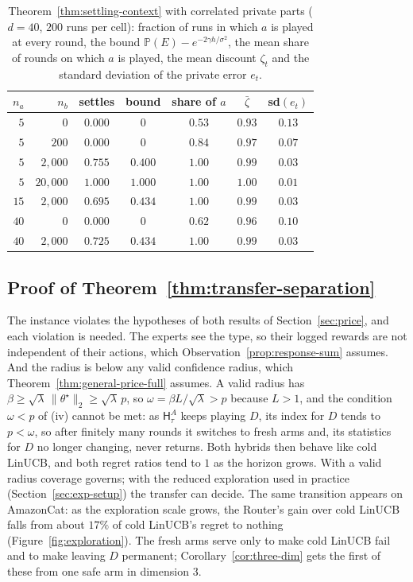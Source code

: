 \documentclass[anon]{alt2027} %
\newcommand{\Prb}{\mathbb{P}}
\newcommand{\Hyb}{\mathsf{H}}
\begin{document}
\begin{table}[!htb]
\centering
\caption{Theorem~\ref{thm:settling-context} with correlated private parts
($d=40$, $200$ runs per cell): fraction of runs in which $a$ is played at
every round, the bound $\Prb(E)-e^{-2\gamma h/\sigma^2}$, the mean share of
rounds on which $a$ is played, the mean discount $\zeta_t$ and the standard
deviation of the private error $e_t$.}
\label{tab:context-corr}
\small
\begin{tabular}{@{}rrccccc@{}}
\toprule
$n_a$ & $n_b$ & settles & bound & share of $a$ & $\bar\zeta$ & sd$(e_t)$\\
\midrule
$5$ & $0$ & $0.000$ & $0$ & $0.53$ & $0.93$ & $0.13$\\
$5$ & $200$ & $0.000$ & $0$ & $0.84$ & $0.97$ & $0.07$\\
$5$ & $2{,}000$ & $0.755$ & $0.400$ & $1.00$ & $0.99$ & $0.03$\\
$5$ & $20{,}000$ & $1.000$ & $1.000$ & $1.00$ & $1.00$ & $0.01$\\
$15$ & $2{,}000$ & $0.695$ & $0.434$ & $1.00$ & $0.99$ & $0.03$\\
$40$ & $0$ & $0.000$ & $0$ & $0.62$ & $0.96$ & $0.10$\\
$40$ & $2{,}000$ & $0.725$ & $0.434$ & $1.00$ & $0.99$ & $0.03$\\
\bottomrule
\end{tabular}
\end{table}

\subsection{Proof of Theorem~\ref{thm:transfer-separation}}
\label{app:proof-sep-only}

\begin{remark}
\label{rem:transfer-regime}
The instance violates the hypotheses of both results of
Section~\ref{sec:price}, and each violation is needed. The experts see the type, so their logged rewards are not
independent of their actions, which Observation~\ref{prop:response-sum}
assumes. And the radius is below any valid confidence radius, which
Theorem~\ref{thm:general-price-full} assumes. A valid radius has
$\beta\ge\sqrt\lambda\,\|\theta^\star\|_2\ge\sqrt\lambda\,p$, so
$\omega=\beta L/\sqrt\lambda>p$ because $L>1$, and the condition $\omega<p$ of
(iv) cannot be met: as $\Hyb^A_\tau$ keeps playing $D$, its index for $D$
tends to $p<\omega$, so after finitely many rounds it switches to fresh arms
and, its statistics for $D$ no longer changing, never returns. Both hybrids
then behave like cold LinUCB, and both regret ratios tend to $1$ as the horizon
grows. With a valid radius coverage governs; with the reduced exploration used
in practice (Section~\ref{sec:exp-setup}) the transfer can decide. The
same transition appears on AmazonCat: as the exploration scale grows, the
Router's gain over cold LinUCB falls from about $17\%$ of cold LinUCB's
regret to nothing (Figure~\ref{fig:exploration}). The fresh
arms serve only to make cold LinUCB fail and to make leaving $D$ permanent;
Corollary~\ref{cor:three-dim} gets the first of these from one safe arm in
dimension $3$.
\end{remark}
\end{document}

